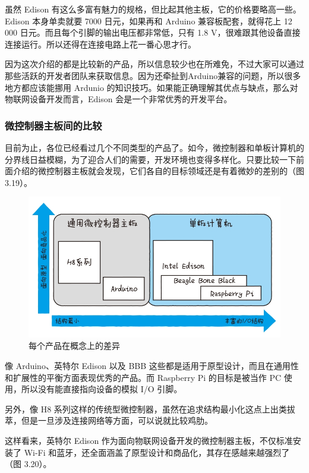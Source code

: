 \documentclass[12pt,UTF8]{ctexbook}
\begin{document}
虽然 Edison 有这么多富有魅力的规格，但比起其他主板，它的价格要略高一些。Edison 本身单卖就要 7000 日元，如果再和 Arduino 兼容板配套，就得花上 12 000 日元。而且每个引脚的输出电压都非常低，只有 1.8 V，很难跟其他设备直接连接运行。所以还得在连接电路上花一番心思才行。

因为这次介绍的都是比较新的产品，所以信息较少也在所难免，不过大家可以通过那些活跃的开发者团队来获取信息。因为还牵扯到Arduino兼容的问题，所以很多地方都应该能挪用 Ardunio 的知识技巧。如果能正确理解其优点与缺点，那么对物联网设备开发而言，Edison 会是一个非常优秀的开发平台。

\subsubsection{微控制器主板间的比较}

目前为止，各位已经看过几个不同类型的产品了。如今，微控制器和单板计算机的分界线日益模糊，为了迎合人们的需要，开发环境也变得多样化。只要比较一下前面介绍的微控制器主板就会发现，它们各自的目标领域还是有着微妙的差别的（图3.19）。

\begin{figure}[htbp]
	\centering
	\includegraphics[width=1\linewidth]{70}
	\caption{每个产品在概念上的差异}
	\label{fig:1}
\end{figure}

像 Arduino、英特尔 Edison 以及 BBB 这些都是适用于原型设计，而且在通用性和扩展性的平衡方面表现优秀的产品。而 Raspberry Pi 的目标是被当作 PC 使用，所以没有能直接指向设备的模拟 I/O 引脚。

另外，像 H8 系列这样的传统型微控制器，虽然在追求结构最小化这点上出类拔萃，但是一旦涉及连接网络等方面，可以说就比较鸡肋。

这样看来，英特尔 Edison 作为面向物联网设备开发的微控制器主板，不仅标准安装了 Wi-Fi 和蓝牙，还全面涵盖了原型设计和商品化，其存在感越来越强烈了（图 3.20）。
\end{document}
